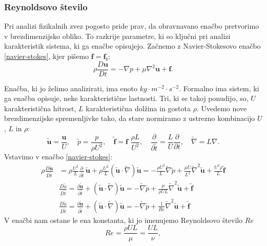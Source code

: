 \documentclass[mat2, tisk]{fmfdelo}
\newcommand{\bd}{\textbf}
\begin{document}
\subsubsection{Reynoldsovo število}
Pri analizi fizikalnih zvez pogosto pride prav, da obravnavano enačbo pretvorimo 
v brezdimenzijsko obliko. To razkrije 
parametre, ki so ključni pri analizi karakteristik sistema, ki ga enačbe opisujejo. 
Začnemo z Navier-Stokesovo enačbo \eqref{navier-stokes}, kjer pišemo $\bd{f} = \bd{f}_b$:
$$
\rho \frac{D \bd{u}}{D t} = - \nabla p + \mu \nabla^2 \bd{u} + \bd{f}.
$$

Enačba, ki jo želimo analizirati, ima enoto $kg \cdot m^{-2}\cdot s^{-2}$. Formalno 
ima sistem, ki ga enačba opisuje, neke karakteristične lastnosti. Tri, ki se takoj ponudijo, so, 
$U$ karakteristična hitrost, $L$ karakteristična dolžina in gostota $\rho$. Uvedemo nove brezdimenzijske
spremenljivke tako, da stare normiramo z ustrezno kombinacijo $U$, $L$ in $\rho$:
$$
\widetilde{\bd{u}} = \frac{\bd{u}}{U}, \quad \widetilde{p} = \frac{p}{\rho U^2}, \quad \widetilde{\bd{f}} = \bd{f} \,\,\frac{\rho L}{U^2},
\quad \frac{\partial}{\partial \widetilde{t}} = \frac{L}{U} \frac{\partial}{\partial t}, \quad 
\widetilde{\nabla} = L\nabla.
$$
Vstavimo v enačbo \ref{navier-stokes}:
\begin{align*}
\rho \frac{D\widetilde{\bd{u}}}{D \widetilde{t}} &= \rho \frac{U^2}{L} \frac{\partial}{\partial \widetilde{t}}\, \widetilde{\bd{u}} + 
\rho \frac{U^2}{L} (\widetilde{\bd{u}} \cdot \widetilde{\nabla}) \widetilde{\bd{u}} = - \frac{\rho U^2}{L} \widetilde{\nabla} \widetilde{p}
+ \frac{\mu U}{L^2} \widetilde{\nabla}^2 \widetilde{\bd{u}} + \frac{U^2 \rho}{L}\widetilde{\bd{f}} \\[2mm]
&\frac{D\widetilde{u}}{D \widetilde{t}} = \frac{\partial \widetilde{\bd{u}}}{\partial \widetilde{t}} + 
(\widetilde{\bd{u}} \cdot \widetilde{\nabla}) \widetilde{\bd{u}} = - \widetilde{\nabla} \widetilde{p}
+ \frac{\mu}{\rho UL} \widetilde{\nabla}^2 \widetilde{\bd{u}} + \widetilde{\bd{f}} \\[2mm]
&\frac{D\widetilde{u}}{D \widetilde{t}} = \frac{\partial \widetilde{\bd{u}}}{\partial \widetilde{t}} + 
(\widetilde{\bd{u}} \cdot \widetilde{\nabla}) \widetilde{\bd{u}} = - \widetilde{\nabla} \widetilde{p}
+ \frac{1}{Re} \widetilde{\nabla}^2 \widetilde{\bd{u}} + \widetilde{\bd{f}}
\end{align*}
V enačbi nam ostane le ena konstanta, ki jo imenujemo Reynoldsovo število $Re$
\begin{equation*}
Re = \frac{\rho UL}{\mu} = \frac{UL}{\nu},
\end{equation*}
\end{document}
